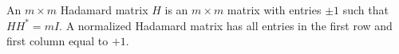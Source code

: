 An $m \times m$ Hadamard matrix $H$ is an $m \times m$ matrix with entries $\pm 1$ such that $HH^* = mI$. A normalized Hadamard matrix has all entries in the first row and first column equal to $+1$.

